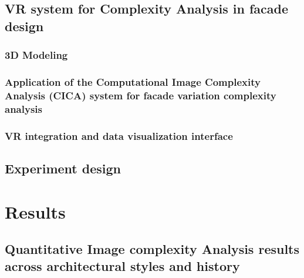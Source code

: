 \documentclass[final,5p,times]{elsarticle}
\begin{document}
\begin{linenumbers}
    \subsection{VR system for Complexity Analysis in facade design}
    \label{subsec:VRsystemDevelopment}
    

    \subsubsection{3D Modeling}
    \label{subsubsec:Modeling}
    

    \subsubsection{Application of the Computational Image Complexity Analysis (CICA) system for facade variation complexity analysis}
    \label{subsubsec:CICAforFacades}
    

    \subsubsection{VR integration and data visualization interface}
    \label{subsubsec:VR_integration}
    

    \subsection{Experiment design}
    \label{subsec:Experiment_design}
    

\section{Results}
\label{sec:Results}


    \subsection{Quantitative Image complexity Analysis results across architectural styles and history}
    \label{subsec:ResultsComplexityImageAnalysishistory}
    


\end{linenumbers}
\end{document}
